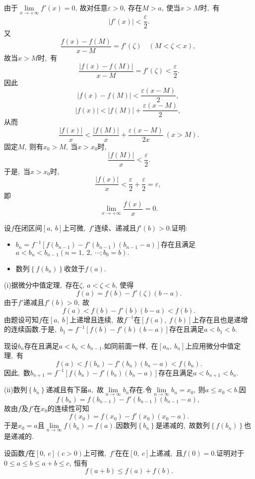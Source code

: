 	\begin{solution}
		由于$\lim\limits_{x\rightarrow+\infty}f'(x)=0,\ $故对任意$\varepsilon>0,\ $存在$M>a,\ $使当$x>M$时,\ 有
		$$\left|f'(x)\right|<\frac{\varepsilon}{2}.$$
		又
		$$\frac{f(x)-f(M)}{x-M}=f'(\zeta)\quad\left(M<\zeta <x\right),\ $$
		故当$x>M$时,\ 有
		$$\frac{\left|f(x)-f(M)\right|}{x-M}=f'(\zeta)<\frac{\varepsilon}{2}.$$
		因此
		$$\left|f(x)-f(M)\right|<\frac{\varepsilon(x-M)}{2},\ $$
		$$|f(x)|<|f(M)|+\frac{\varepsilon(x-M)}{2},\ $$
		从而
		$$\frac{|f(x)|}{x}<\frac{|f(M)|}{x}+\frac{\varepsilon(x-M)}{2x}\ (x>M).$$
		固定$M,\ $则有$x_0>M,\ $当$x>x_0$时,\ 
		$$\frac{|f(M)|}{x}<\frac{\varepsilon}{2}.$$
		于是,\ 当$x>x_0$时,\ 
		$$\frac{|f(x)|}{x}<\frac{\varepsilon}{2}+\frac{\varepsilon}{2}=\varepsilon,\ $$
		即
		$$\lim\limits_{x\rightarrow+\infty}\frac{f(x)}{x}=0.$$ 
	\end{solution}
	\newpage
	\begin{problem}
		设$f$在闭区间$\left[a,\ b\right]$上可微,\ $f'$连续、递减且$f'(b)>0.$证明:
		\begin{itemize}
			\item[(i)]$b_n=f^{-1}\left[f(b_{n-1})-f'(b_{n-1})(b_{n-1}-a)\right]$存在且满足$a<b_n<b_{n-1}(n=1,\ 2,\ \cdots;b_0=b).$
			\item[(ii)]数列$\left\{f(b_n)\right\}$收敛于$f(a)$.
		\end{itemize}
	\end{problem}
	
	\begin{solution}
		(i)据微分中值定理,\ 存在$\zeta,\ a<\zeta<b,\ $使得
		$$f(a)=f(b)-f'(\zeta)(b-a).$$
		由于$f'$递减且$f'(b)>0,\ $故
		$$f(a)<f(b)-f'(b)(b-a)<f(b).$$
		由题设可知$f$在$\left[a,\ b\right]$上递增且连续,\ 故$f^{-1}$在$\left[f(a),\ f(b)\right]$上存在且也是递增的连续函数.于是,\ $b_1=f^{-1}\left[f(b)-f'(b)(b-a)\right]$存在且满足$a<b_1<b.$
		
		现设$b_n$存在且满足$a<b_n<b_{n-1}.$如同前面一样,\ 在$\left[a_n,\ b_n\right]$上应用微分中值定理,\ 有
		$$f(a)<f(b_n)-f'(b_n)(b_n-a)<f(b_n).$$
		因此,\ 数$b_{n+1}=f^{-1}\left[f(b_n)-f'(b_n)(b_n-a)\right]$存在且满足$a<b_{n+1}<b_n.$
		
		(ii)数列$\left\{b_n\right\}$递减且有下届$a$,\ 故$\lim\limits_{n\rightarrow\infty}b_n$存在.令$\lim\limits_{n\rightarrow\infty}b_n=x_0,\ $则$a\le x_0<b.$因
		$$f(b_n)=f(b_{n-1})-f'(b_{n-1})(b_{n-1}-a),\ $$
		故由$f$及$f'$在$x_0$的连续性可知
		$$f(x_0)=f(x_0)-f'(x_0)(x_0-a).$$
		于是$x_0=a$且$\lim\limits_{n\rightarrow\infty}f(b_n)=f(a).$因数列$\left\{b_n\right\}$是递减的,\ 故数列$\left\{f(b_n)\right\}$也是递减的. 
	\end{solution}
	\newpage
	\begin{problem}
		设函数$f$在$\left[0,\ c\right](c>0)$上可微,\ $f'$在在$\left[0,\ c\right]$上递减,\ 且$f(0)=0.$证明对于$0\le a\le b\le a+b\le c,\ $恒有
		$$f(a+b)\le f(a)+f(b).$$
	\end{problem}
	
